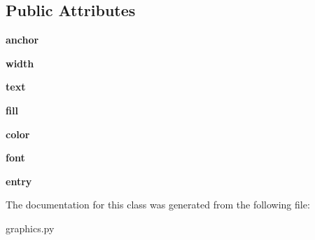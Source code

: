 \subsection*{Public Attributes}
\begin{DoxyCompactItemize}
\item 
\mbox{\label{classgraphics_1_1_entry_a80e7267b0c2117459d13532c253e608f}} 
{\bfseries anchor}
\item 
\mbox{\label{classgraphics_1_1_entry_a3c71a6cb1110ae9da3edef095fbb61e5}} 
{\bfseries width}
\item 
\mbox{\label{classgraphics_1_1_entry_ad606e7fd6c89a56ffd6c35385bc050e6}} 
{\bfseries text}
\item 
\mbox{\label{classgraphics_1_1_entry_aaa0a15f51427af10dd5adc7e0aa3d553}} 
{\bfseries fill}
\item 
\mbox{\label{classgraphics_1_1_entry_a96d564c2ac5f5bc21e6353f7b6e702c1}} 
{\bfseries color}
\item 
\mbox{\label{classgraphics_1_1_entry_a03940868372e90882d320d9a402dec14}} 
{\bfseries font}
\item 
\mbox{\label{classgraphics_1_1_entry_a344bdacc19d9c10e355e21357a94c38d}} 
{\bfseries entry}
\end{DoxyCompactItemize}


The documentation for this class was generated from the following file\+:\begin{DoxyCompactItemize}
\item 
graphics.\+py\end{DoxyCompactItemize}
